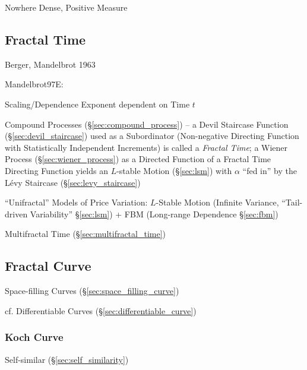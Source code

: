 Nowhere Dense, Positive Measure



\subsection{Fractal Time}\label{sec:fractal_time}

Berger, Mandelbrot 1963

Mandelbrot97E:

Scaling/Dependence Exponent dependent on Time $t$

Compound Processes (\S\ref{sec:compound_process}) -- a Devil Staircase Function
(\S\ref{sec:devil_staircase}) used as a Subordinator (Non-negative Directing
Function with Statistically Independent Increments) is called a \emph{Fractal
  Time}; a Wiener Process (\S\ref{sec:wiener_process}) as a Directed Function of
a Fractal Time Directing Function yields an $L$-stable Motion (\S\ref{sec:lsm})
with $\alpha$ ``fed in'' by the L\'evy Staircase (\S\ref{sec:levy_staircase})

``Unifractal'' Models of Price Variation: $L$-Stable Motion
(Infinite Variance, ``Tail-driven Variability'' \S\ref{sec:lsm}) + FBM
(Long-range Dependence \S\ref{sec:fbm})

\fist Multifractal Time (\S\ref{sec:multifractal_time})



\subsection{Fractal Curve}\label{sec:fractal_curve}

Space-filling Curves (\S\ref{sec:space_filling_curve})

cf. Differentiable Curves (\S\ref{sec:differentiable_curve})



\subsubsection{Koch Curve}\label{sec:koch_curve}

Self-similar (\S\ref{sec:self_similarity})



